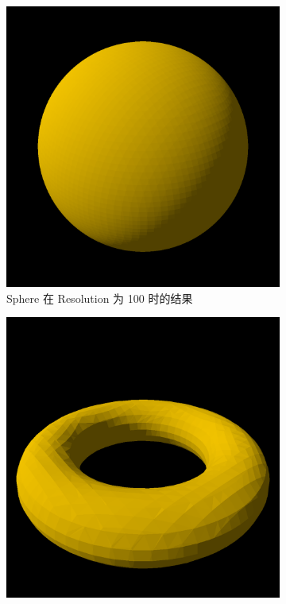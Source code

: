 \documentclass[UTF8]{ctexart}
\begin{document}
\begin{figure}[h]
\begin{subfigure}[b]{0.48\textwidth}
        \includegraphics[height=0.3\textheight]{images/5-2.png}
        \caption{Sphere 在 Resolution 为 100 时的结果}
    \end{subfigure}
    \begin{subfigure}[b]{0.48\textwidth}
        \centering
        \includegraphics[height=0.3\textheight]{images/5-3.png}

\end{subfigure}
\end{figure}
\end{document}
